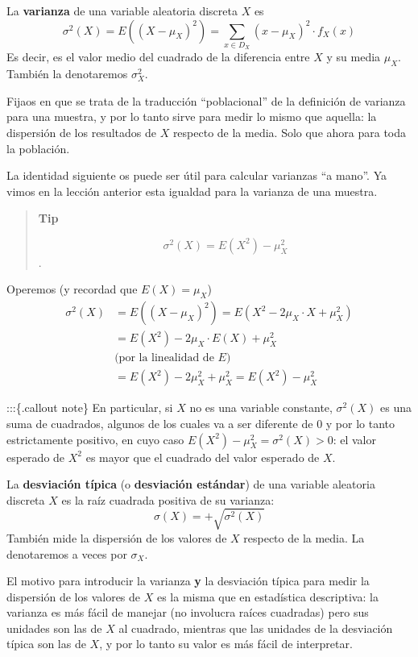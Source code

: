 \documentclass[
  spanish,
  letterpaper,
  DIV=11,
  numbers=noendperiod]{scrreprt}
\begin{document}
\begin{tcolorbox}
La \textbf{varianza} de una variable aleatoria discreta \(X\) es \[
\sigma^2(X) =E((X-\mu_X)^2) =\sum_{x\in D_X} (x-\mu_X)^2\cdot f_X(x)
\] Es decir, es el valor medio del cuadrado de la diferencia entre \(X\)
y su media \(\mu_X\). También la denotaremos \(\sigma_X^2\).

Fijaos en que se trata de la traducción ``poblacional'' de la definición
de varianza para una muestra, y por lo tanto sirve para medir lo mismo
que aquella: la dispersión de los resultados de \(X\) respecto de la
media. Solo que ahora para toda la población.

La identidad siguiente os puede ser útil para calcular varianzas ``a
mano''. Ya vimos en la lección anterior esta igualdad para la varianza
de una muestra.

\begin{quote}
\textbf{Tip}

\[\sigma^2(X)=E(X^2)-\mu_X^2\].
\end{quote}

Operemos (y recordad que \(E(X)=\mu_X\)) \[
\begin{array}{rl}
\sigma^2(X)\!\!\!\!\! & =E((X-\mu_X)^2)=E(X^2-2\mu_X\cdot X+\mu_X^2)\\
& = E(X^2)-2\mu_X\cdot E(X)+\mu_X^2\\
& \text{(por la linealidad de $E$)}\\
& = E(X^2)-2\mu_X^2+\mu_X^2=E(X^2)-\mu_X^2
\end{array}
\]

:::\{.callout note\} En particular, si \(X\) no es una variable
constante, \(\sigma^2(X)\) es una suma de cuadrados, algunos de los
cuales va a ser diferente de 0 y por lo tanto estrictamente positivo, en
cuyo caso \(E(X^2)-\mu_X^2=\sigma^2(X)>0\): el valor esperado de \(X^2\)
es mayor que el cuadrado del valor esperado de \(X\).

\end{tcolorbox}

La \textbf{desviación típica} (o \textbf{desviación estándar}) de una
variable aleatoria discreta \(X\) es la raíz cuadrada positiva de su
varianza: \[
\sigma(X)=+\sqrt{\sigma^2(X)}
\] También mide la dispersión de los valores de \(X\) respecto de la
media. La denotaremos a veces por \(\sigma_X\).

El motivo para introducir la varianza \textbf{y} la desviación típica
para medir la dispersión de los valores de \(X\) es la misma que en
estadística descriptiva: la varianza es más fácil de manejar (no
involucra raíces cuadradas) pero sus unidades son las de \(X\) al
cuadrado, mientras que las unidades de la desviación típica son las de
\(X\), y por lo tanto su valor es más fácil de interpretar.
\end{document}
